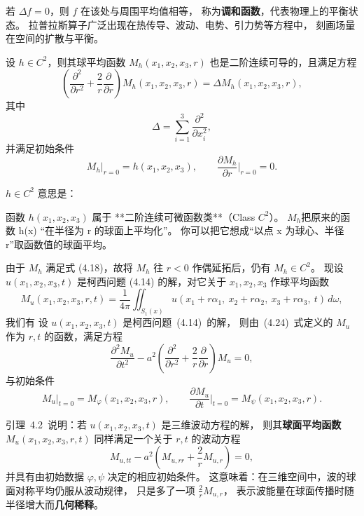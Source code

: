 \begin{solution}
\begin{definition}
若 $\Delta f=0$，则 $f$ 在该处与周围平均值相等，
称为\textbf{调和函数}，代表物理上的平衡状态。
拉普拉斯算子广泛出现在热传导、波动、电势、引力势等方程中，
刻画场量在空间的扩散与平衡。
\end{definition}
\begin{lemma}[$M_h$初始条件球平均函数的性质]
设 $h \in C^2$，则其球平均函数 $M_h(x_1,x_2,x_3,r)$ 也是二阶连续可导的，且满足方程
\[
\left(
\frac{\partial^2}{\partial r^2}
+ \frac{2}{r}\frac{\partial}{\partial r}
\right)
M_h(x_1,x_2,x_3,r)
= \Delta M_h(x_1,x_2,x_3,r),
\tag{4.17}
\]
其中
\[
\Delta = \sum_{i=1}^{3} \frac{\partial^2}{\partial x_i^2},
\]
并满足初始条件
\[
M_h\big|_{r=0} = h(x_1,x_2,x_3),
\qquad
\frac{\partial M_h}{\partial r}\Big|_{r=0} = 0.
\tag{4.18}
\]
\end{lemma}
\begin{remark}
\( h \in C^2 \) 意思是：

函数 \( h(x_1, x_2, x_3) \) 属于 **二阶连续可微函数类**（Class \( C^2 \)）。
$M_h $把原来的函数 h(x) “在半径为 r 的球面上平均化”。
你可以把它想成“以点 x 为球心、半径 r”取函数值的球面平均。
\end{remark}

\begin{lemma}[$M_u$波动方程解的球平均函数的性质]
由于 $M_h$ 满足式 (4.18)，故将 $M_h$ 往 $r<0$ 作偶延拓后，仍有 $M_h \in C^2$。  
现设 $u(x_1,x_2,x_3,t)$ 是柯西问题 (4.14) 的解，对它关于 $x_1,x_2,x_3$ 作球平均函数  
\[
M_u(x_1,x_2,x_3,r,t)
= \frac{1}{4\pi} \iint_{S_1(x)} 
u(x_1 + r\alpha_1,\ x_2 + r\alpha_2,\ x_3 + r\alpha_3,\ t)\, d\omega,
\tag{4.24}
\]
我们有
设 $u(x_1,x_2,x_3,t)$ 是柯西问题~(4.14)~的解，
则由~(4.24)~式定义的 $M_u$ 作为 $r,t$ 的函数，满足方程
\[
\frac{\partial^2 M_u}{\partial t^2}
- a^2\!\left(
\frac{\partial^2}{\partial r^2}
+ \frac{2}{r}\frac{\partial}{\partial r}
\right) M_u = 0,
\tag{4.25}
\]
与初始条件
\[
M_u\big|_{t=0} = M_{\varphi}(x_1,x_2,x_3,r),
\qquad
\frac{\partial M_u}{\partial t}\Big|_{t=0}
= M_{\psi}(x_1,x_2,x_3,r).
\tag{4.26--4.27}
\]
\end{lemma}

\begin{remark}
引理~4.2~说明：若 $u(x_1,x_2,x_3,t)$ 是三维波动方程的解，
则其\textbf{球面平均函数} $M_u(x_1,x_2,x_3,r,t)$
同样满足一个关于 $r,t$ 的波动方程
\[
M_{u,tt} - a^2\!\left(M_{u,rr} + \frac{2}{r}M_{u,r}\right) = 0,
\]
并具有由初始数据 $\varphi,\psi$ 决定的相应初始条件。
这意味着：在三维空间中，波的球面对称平均仍服从波动规律，
只是多了一项 $\tfrac{2}{r}M_{u,r}$，
表示波能量在球面传播时随半径增大而\textbf{几何稀释}。


\end{remark}
\end{solution}
